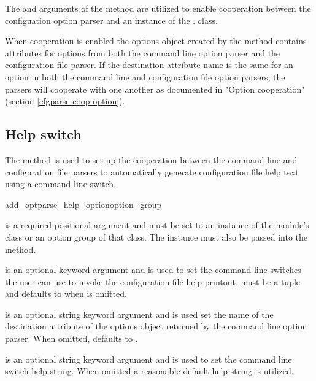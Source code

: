 \documentclass{howto}
\begin{document}
The  and  arguments of the  method are
utilized to enable cooperation between the configuation option parser and an
instance of the . class.

When cooperation is enabled the options object created by the 
method contains attributes for options from both the command line option 
parser and the configuration file parser.  If the destination attribute
name is the same for an option in both the command line and configuration
file option parsers, the parsers will cooperate with one another as 
documented in "Option cooperation" (section \ref{cfgparse-coop-option}). 

\subsection{Help switch\label{cfgparse-coop-help}}
        
The  method is used to set up the cooperation
between the command line and configuration file parsers to automatically
generate configuration file help text using a command line switch.
 
  \begin{funcdesc}{add_optparse_help_option}{option_group
          }
    
     is a required positional argument and must be set to 
        an instance of the  module's  
        class or an option group of that class.  The  
        instance must also be passed into the  method.
        
     is an optional keyword argument and is used to set
        the command line switches the user can use to invoke the configuration
        file help printout.   must be a tuple and defaults to
         when  is omitted.
        
     is an optional string keyword argument and is used set the 
        name of the destination attribute of the options object returned
        by the command line option parser.  When omitted,  defaults
        to .
        
     is an optional string keyword argument and is used to set
        the command line switch help string.  When omitted a reasonable 
        default help string is utilized.
  
  \end{funcdesc}
\end{document}
